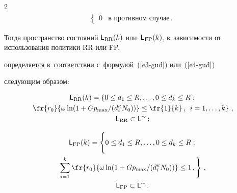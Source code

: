\begin{multicols}{2}
\begin{multline}
\begin{cases}
0 & \mbox{в~противном~случае}\,.


\end{cases}


\label{e4-gud}


\end{multline}


    Тогда пространство состояний ${\sf L}_{\mathrm{RR}}(k)$ или~${\sf 


L}_{\mathrm{FP}}(k)$, в~зависимости от использования политики RR или FP, 


определяется в~соответствии с~формулой~(\ref{e3-gud}) или~(\ref{e4-gud}) 


следующим образом:


  \begin{multline}


  {\sf L}_{\mathrm{RR}}(k)= \left\{


  \vphantom{\fr{1}{k}}


  0\leq d_1\leq R,\ldots , 0\leq d_k\leq R:\right.\\


\left.   \fr{r_0}{\omega\ln 


(1+Gp_{\max}/(d_i^\kappa N_0))}\leq \fr{1}{k}\,,\enskip i=1,\ldots, 


k\right\}\,,\\ {\sf L}_{\mathrm{RR}}\subset {\sf L}^{\sim}\,;


  \label{e5-gud}


  \end{multline}


  


  \vspace*{-12pt}


  


  \noindent


  \begin{multline}


  {\sf L}_{\mathrm{FP}}(k)= \left\{


  \vphantom{\sum\limits^k_{i=1}}


  0\leq d_1\leq R,\ldots , 0\leq d_k\leq R:\right.\\


   \left.\sum\limits^k_{i=1} \fr{r_0}{\omega\ln 


(1+Gp_{\max}/(d_i^\kappa N_0))}\leq 1\,,\right\}\,,\\


 {\sf  L}_{\mathrm{FP}}\subset {\sf L}^{\sim}\,.



\end{multline}
\end{multicols}
